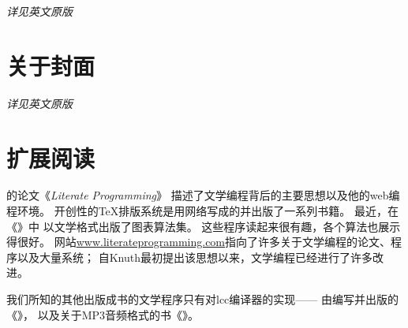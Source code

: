 {\itshape 详见英文原版}

\section*{关于封面}\label{sec:关于封面}

{\itshape 详见英文原版}

\section*{扩展阅读}\label{sec:扩展阅读0}

\citet{10.1093/comjnl/27.2.97}的论文《\emph{Literate Programming}》
描述了文学编程背后的主要思想以及他的{\ttfamily web}编程环境。
开创性的\TeX 排版系统是用网络写成的并出版了一系列书籍\citep{10.5555/536126,10.5555/536123}。
最近，\citet{10.1145/164984}在《》中
以文学格式出版了图表算法集。
这些程序读起来很有趣，各个算法也展示得很好。
网站\url{www.literateprogramming.com}指向了许多关于文学编程的论文、程序以及大量系统；
自Knuth最初提出该思想以来，文学编程已经进行了许多改进。


我们所知的其他出版成书的文学程序只有对lcc编译器的实现——
由\citet{10.5555/555424}编写并出版的《》，
以及\citet{10.5555/1036653}关于MP3音频格式的书《》。

